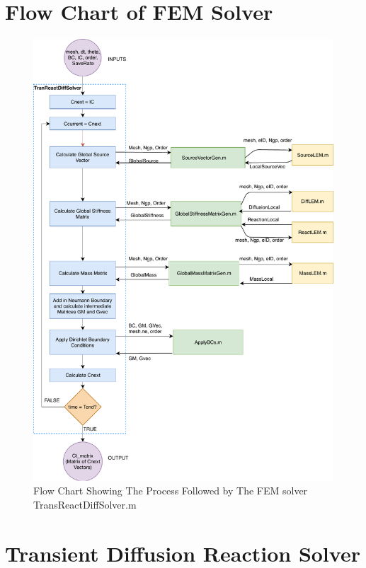 \documentclass[11pt]{article}
\begin{document}
\FloatBarrier
\begin{appendices}





\section{Flow Chart of FEM Solver}

\begin{figure}[ht]  %
	\centering
	\includegraphics[width=.88\textwidth]{TRDS_FLOW.pdf}
    \caption{Flow Chart Showing The Process Followed by The FEM solver TransReactDiffSolver.m}\label{fig:TRDS}
\end{figure}
\clearpage


\section{Transient Diffusion Reaction Solver}\label{ap:TRDS}


\end{appendices}
\end{document}
